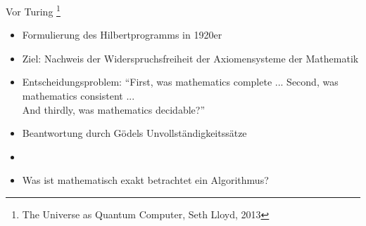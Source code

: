 \documentclass[aspectratio=1610, 9pt]{beamer}
\begin{document}
\begin{frame}{Vor Turing \footnote[8]{The Universe as Quantum Computer, Seth Lloyd, 2013}}
  \begin{itemize}
    \item Formulierung des Hilbertprogramms in 1920er
    \item Ziel: Nachweis der Widerspruchsfreiheit der Axiomensysteme der Mathematik
    \item[\rightarrow] Entscheidungsproblem: \enquote{First, was mathematics complete ... Second, was mathematics consistent ... \\ And thirdly, was mathematics decidable?}
    \item[\rightarrow] Beantwortung durch Gödels Unvollständigkeitssätze
    \item[]
    \item Was ist mathematisch exakt betrachtet ein Algorithmus?
  \end{itemize}

\end{frame}
\end{document}
